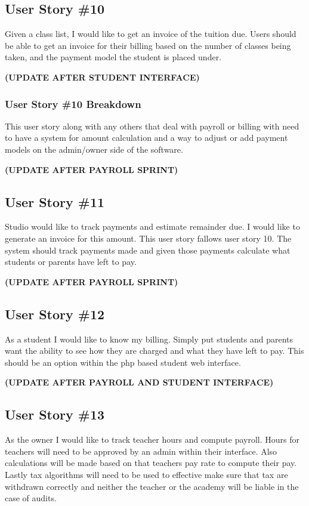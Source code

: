 \subsection{User Story \#10}
Given a class list, I would like to get an invoice of the tuition due. Users should be able to get an invoice for their billing based on the number of classes being taken, and the payment model the student is placed under.

\bf(UPDATE AFTER STUDENT INTERFACE)

\subsubsection{User Story \#10 Breakdown}
This user story along with any others that deal with payroll or billing with need to have a system for amount calculation and a way to adjust or add payment models on the admin/owner side of the software.

\bf(UPDATE AFTER PAYROLL SPRINT)

\subsection{User Story \#11}
Studio would like to track payments and estimate remainder due.  I would like to generate an invoice for this amount. This user story fallows user story 10. The system should track payments made and given those payments calculate what students or parents have left to pay.

\bf(UPDATE AFTER PAYROLL SPRINT)

\subsection{User Story \#12}
As a student I would like to know my billing. Simply put students and parents want the ability to see how they are charged and what they have left to pay. This should be an option within the php based student web interface.

\bf(UPDATE AFTER PAYROLL AND STUDENT INTERFACE)

\subsection{User Story \#13}
As the owner I would like to track teacher hours and compute payroll. Hours for teachers will need to be approved by an admin within their interface. Also calculations will be made based on that teachers pay rate to compute their pay. Lastly tax algorithms will need to be used to effective make sure that tax are withdrawn correctly and neither the teacher or the academy will be liable in the case of audits.

